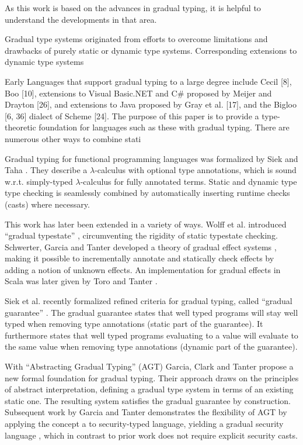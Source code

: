 As this work is based on the advances in gradual typing, it is helpful to understand the developments in that area.

Gradual type systems originated from efforts to overcome limitations and drawbacks of purely static or dynamic type systems.
Corresponding extensions to dynamic type systems 

Early 
Languages that support gradual typing
to a large degree include Cecil [8], Boo [10], extensions to Visual
Basic.NET and C\# proposed by Meijer and Drayton [26], and extensions
to Java proposed by Gray et al. [17], and the Bigloo [6, 36]
dialect of Scheme [24]. The purpose of this paper is to provide a
type-theoretic foundation for languages such as these with gradual
typing.
There are numerous other ways to combine stati



Gradual typing for functional programming languages was formalized by Siek and Taha \cite{siek2006gradual}.
They describe a $\lambda$-calculus with optional type annotations, which is sound w.r.t. simply-typed $\lambda$-calculus for fully annotated terms.
Static and dynamic type type checking is seamlessly combined by automatically inserting runtime checks (casts) where necessary.

This work has later been extended in a variety of ways.
Wolff et al. introduced “gradual typestate” \cite{wolff2011gradual}, circumventing the rigidity of static typestate checking.
Schwerter, Garcia and Tanter developed a theory of gradual effect systems \cite{banados2014theory}, making it possible to incrementally annotate and statically check effects by adding a notion of unknown effects.
An implementation for gradual effects in Scala was later given by Toro and Tanter \cite{toro2015customizable}.

\label{grad-guarantee}
Siek et al. recently formalized refined criteria for gradual typing, called “gradual guarantee” \cite{siek2015refined}.
The gradual guarantee states that well typed programs will stay well typed when removing type annotations (static part of the guarantee).
It furthermore states that well typed programs evaluating to a value will evaluate to the same value when removing type annotations (dynamic part of the guarantee).


With “Abstracting Gradual Typing” (AGT) \cite{garcia2016abstracting} Garcia, Clark and Tanter propose a new formal foundation for gradual typing.
Their approach draws on the principles of abstract interpretation, defining a gradual type system in terms of an existing static one.
The resulting system satisfies the gradual guarantee by construction.
Subsequent work by Garcia and Tanter demonstrates the flexibility of AGT by applying the concept a to security-typed language, yielding a gradual security language \cite{garcia2015deriving}, which in contrast to prior work does not require explicit security casts.
